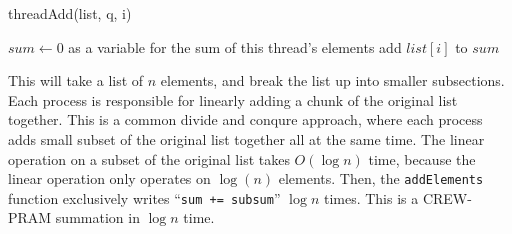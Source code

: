 \documentclass{article}
\renewcommand{\_}{\ifincsname_\else\legacyunderscore\fi}
\begin{document}
\begin{enumerate}
\begin{enumerate}
	\begin{function}
            \DontPrintSemicolon
            \caption{threadAdd(list, q, i)}
            \label{alg:threadAdd}
            $sum \gets 0$ as a variable for the sum of this thread's elements\;
            {
                add $list\left[i\right]$ to $sum$
            }
        \end{function}
This will take a list of $n$ elements, and break the list up into smaller subsections. Each process is responsible for linearly adding a chunk of the original list together. This is a common divide and conqure approach, where each process adds small subset of the original list together all at the same time. The linear operation on a subset of the original list takes $O(\log n)$ time, because the linear operation only operates on $\log(n)$ elements. Then, the \texttt{addElements} function exclusively writes ``\verb|sum += subsum|'' $\log n$ times.  This is a CREW-PRAM summation in $\log n$ time.
	\end{enumerate}


\end{enumerate}
\end{document}
